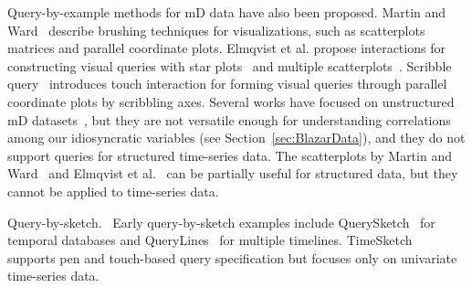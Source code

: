 Query-by-example methods for mD data have also been proposed.
Martin and Ward~\cite{Martin2005} describe brushing techniques for visualizations,
such as scatterplots matrices and parallel coordinate plots.
Elmqvist et al. propose interactions for constructing visual queries with star plots~\cite{Elmqvist2007} and multiple scatterplots~\cite{Elmqvist2008}.
Scribble query~\cite{Nielsen2016} introduces touch interaction for forming visual queries
through parallel coordinate plots by scribbling axes. 
Several works have focused on unstructured mD datasets~\cite{Martin2005,Elmqvist2007,Nielsen2016}, 
but they are not versatile enough for understanding correlations among our idiosyncratic variables (see Section~\ref{sec:BlazarData}), and they do not support queries for structured time-series data.
The scatterplots by Martin and Ward~\cite{Martin2005} and Elmqvist et al.~\cite{Elmqvist2008} can be partially useful for structured data, but they cannot be applied to time-series data.

\textsf{Query-by-sketch.\ } 
Early query-by-sketch examples include QuerySketch~\cite{Wattenberg2001} for temporal databases and QueryLines~\cite{Ryall2005} for multiple timelines. 
TimeSketch~\cite{Eichmann2015} supports pen and touch-based query specification but focuses only on univariate time-series data.

